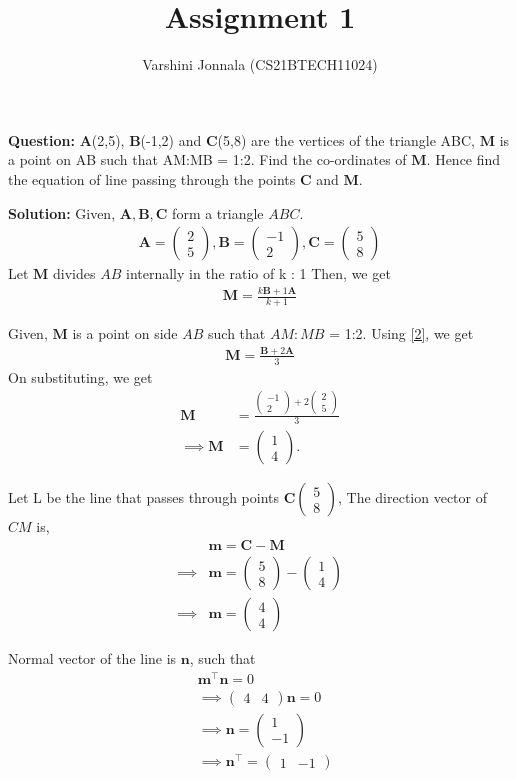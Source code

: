 \documentclass[journal,12pt,twocolumn]{IEEEtran}
\title{Assignment 1}
\author{Varshini Jonnala (CS21BTECH11024)}
\let\vec\mathbf
\newcommand{\myvec}[1]{\ensuremath{\begin{pmatrix}#1\end{pmatrix}}}
\begin{document}
    \maketitle
    \textbf{Question: }
      $\vec{A}$(2,5), $\vec{B}$(-1,2) and $\vec{C}$(5,8) are the vertices of the triangle ABC, $\vec{M}$ is a point on AB such that AM:MB = 1:2. Find the co-ordinates of $\vec{M}$. Hence find the equation of line passing through the points $\vec{C}$ and $\vec{M}$.

    \textbf{Solution: }
     Given, $\vec{A}, \vec{B}, \vec{C}$ form a triangle $ABC$.
	\begin{align}
		\vec{A} = \myvec{2 \\ 5} ,
		\vec{B} = \myvec{-1 \\ 2},
		\vec{C} = \myvec{5 \\ 8}
	\end{align}
   Let $\vec{M}$ divides $AB$ internally in the ratio of k : 1
    Then, we get 
    \begin{align}
       \label{2} \vec{M}=\frac{k\vec{B}+1\vec{A}}{k+1}
    \end{align}

    Given, $\vec{M}$ is a point on side $AB$ such that $AM:MB$ = 1:2. 
        Using \eqref{2}, we get
    \begin{align}
        \vec{M} = \frac{\vec{B}+2\vec{A}}{3}
    \end{align}
    On substituting, we get
    \begin{align}
        \vec{M} &= \frac{\myvec{-1 \\ 2} + 2\myvec{2 \\ 5}}{3}\\ \implies \vec{M} &= \myvec{1\\4}.
    \end{align}
    
    Let L be the line that passes through points $\vec{C}\myvec{5\\8}$,
    The direction vector of $CM$ is,
    \begin{align}
        &\vec{m} = \vec{C} - \vec{M}\\
	    \implies &\vec{m} = \myvec{5 \\ 8} - \myvec{1 \\ 4}\\
	    \implies &\vec{m} = \myvec{4 \\ 4}
    \end{align}
    
    Normal vector of the line is $\vec{n}$, such that
    \begin{align}
	    &\vec{m}^{\top}\vec{n} = 0\\
	    &\implies \myvec{4 & 4}\vec{n} = 0\\
	    &\implies \vec{n} = \myvec{1 \\ -1}\\
	    &\implies \vec{n}^{\top} = \myvec{1 & -1}
    \end{align}
    
\end{document}
